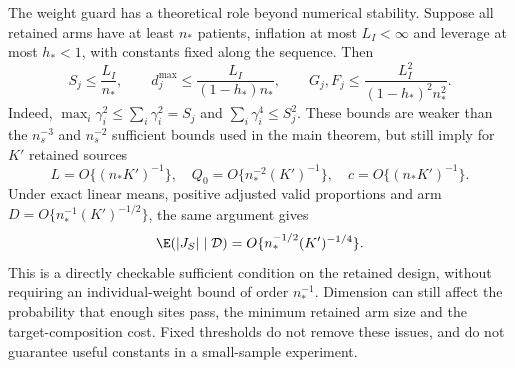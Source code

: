 The weight guard has a theoretical role beyond numerical stability. Suppose
all retained arms have at least $n_*$ patients, inflation at most $L_I<\infty$
and leverage at most $h_*<1$, with constants fixed along the sequence. Then
\[
 S_j\le\frac{L_I}{n_*},\qquad
 d_j^{\max}\le\frac{L_I}{(1-h_*)n_*},\qquad
 G_j,F_j\le\frac{L_I^2}{(1-h_*)^2n_*^2}.
\]
Indeed, $\max_i\gamma_i^2\le\sum_i\gamma_i^2=S_j$ and
$\sum_i\gamma_i^4\le S_j^2$. These bounds are weaker than the
$n_s^{-3}$ and $n_s^{-2}$ sufficient bounds used in the main theorem, but
still imply for $K'$ retained sources
\[
 L=O\{(n_*K')^{-1}\},\quad
 Q_0=O\{n_*^{-2}(K')^{-1}\},\quad
 c=O\{(n_*K')^{-1}\}.
\]
Under exact linear means, positive adjusted valid proportions and arm
$D=O\{n_*^{-1}(K')^{-1/2}\}$, the same argument gives
\[
 \E(|J_S|\mid\mathcal D)=O\{n_*^{-1/2}(K')^{-1/4}\}.
\]
This is a directly checkable sufficient
condition on the retained design, without requiring an individual-weight
bound of order $n_*^{-1}$. Dimension can still affect the probability that
enough sites pass, the minimum retained arm size and the target-composition
cost. Fixed thresholds do not remove these issues, and do not guarantee useful
constants in a small-sample experiment.
